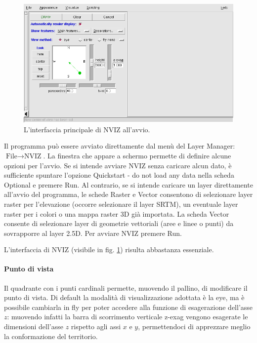 	\begin{figure}
		\centering
		\includegraphics[scale=0.5]{img/screenshot_005}
		\caption{{\small \label{fig:L'interfaccia-principale-di-NVIZ}L'interfaccia principale di NVIZ all'avvio.}}
	\end{figure}
	
	Il programma può essere avviato direttamente dal menù del Layer Manager: \textsf{$\text{File}\rightarrow\text{NVIZ}$}. La finestra che appare a schermo permette di definire alcune opzioni per l'avvio. Se si intende avviare NVIZ senza caricare alcun dato, è sufficiente spuntare l'opzione \textsf{Quickstart - do not load any data} nella scheda \textsf{Optional} e premere \textsf{Run}. Al contrario, se si intende caricare un layer direttamente all'avvio del programma, le schede \textsf{Raster} e \textsf{Vector} consentono di selezionare layer raster per l'elevazione (occorre selezionare il layer SRTM), un eventuale layer raster per i colori o una mappa raster 3D già importata. La scheda \textsf{Vector} consente di selezionare layer di geometrie vettoriali (aree e linee o punti) da sovrapporre al layer 2.5D. Per avviare NVIZ premere \textsf{Run}.

	L'interfaccia di NVIZ (visibile in fig. \ref{fig:L'interfaccia-principale-di-NVIZ}) risulta abbastanza essenziale.

			\paragraph{Punto di vista}
				Il quadrante con i punti cardinali permette, muovendo il pallino, di modificare il punto di vista. Di default la modalità di visualizzazione adottata è la \textsf{eye}, ma è possibile cambiarla in \textsf{fly} per poter accedere alla funzione di esagerazione dell'asse $z$: muovendo infatti la barra di scorrimento verticale \textsf{z-exag} vengono esagerate le dimensioni dell'asse $z$ rispetto agli assi $x$ e $y$, permettendoci di apprezzare meglio la conformazione del territorio.

